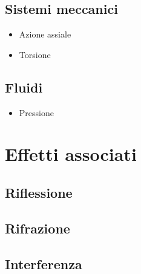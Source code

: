 \documentclass[letterpaper,10pt,italian]{jupyterBook}
\begin{document}
\subsection{Sistemi meccanici}
\label{\detokenize{ch/waves/intro:sistemi-meccanici}}\begin{itemize}
\item {} 
\sphinxAtStartPar
Azione assiale

\item {} 
\sphinxAtStartPar
Torsione

\end{itemize}


\subsection{Fluidi}
\label{\detokenize{ch/waves/intro:fluidi}}\begin{itemize}
\item {} 
\sphinxAtStartPar
Pressione

\end{itemize}


\subsection{}
\label{\detokenize{ch/waves/intro:id1}}

\section{Effetti associati}
\label{\detokenize{ch/waves/intro:effetti-associati}}\label{\detokenize{ch/waves/intro:physics-hs-waves-effects}}

\subsection{Riflessione}
\label{\detokenize{ch/waves/intro:riflessione}}\label{\detokenize{ch/waves/intro:physics-hs-waves-effects-reflection}}

\subsection{Rifrazione}
\label{\detokenize{ch/waves/intro:rifrazione}}\label{\detokenize{ch/waves/intro:physics-hs-waves-effects-refraction}}

\subsection{Interferenza}
\label{\detokenize{ch/waves/intro:interferenza}}\label{\detokenize{ch/waves/intro:physics-hs-waves-effects-interference}}
\end{document}
